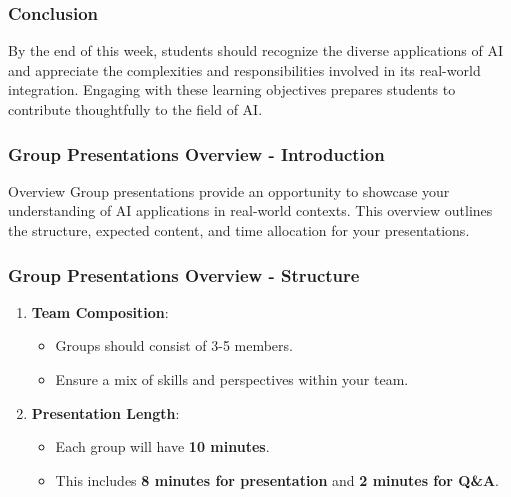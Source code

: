 \documentclass[aspectratio=169]{beamer}
\begin{document}
\begin{frame}[fragile]
    \frametitle{Conclusion}
    By the end of this week, students should recognize the diverse applications of AI and appreciate the complexities and responsibilities involved in its real-world integration. Engaging with these learning objectives prepares students to contribute thoughtfully to the field of AI.
\end{frame}

\begin{frame}[fragile]
    \frametitle{Group Presentations Overview - Introduction}
    \begin{block}{Overview}
        Group presentations provide an opportunity to showcase your understanding of AI applications in real-world contexts. This overview outlines the structure, expected content, and time allocation for your presentations.
    \end{block}
\end{frame}

\begin{frame}[fragile]
    \frametitle{Group Presentations Overview - Structure}
    \begin{enumerate}
        \item \textbf{Team Composition}:
            \begin{itemize}
                \item Groups should consist of 3-5 members.
                \item Ensure a mix of skills and perspectives within your team.
            \end{itemize}
        \item \textbf{Presentation Length}:
            \begin{itemize}
                \item Each group will have \textbf{10 minutes}.
                \item This includes \textbf{8 minutes for presentation} and \textbf{2 minutes for Q\&A}.
            \end{itemize}
    \end{enumerate}
\end{frame}
\end{document}
